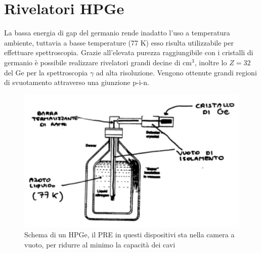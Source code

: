 \section{Rivelatori HPGe}
La bassa energia di gap del germanio rende inadatto l'uso a temperatura ambiente, tuttavia a basse temperature (77 K) esso risulta utilizzabile
per effettuare spettroscopia.
Grazie all'elevata purezza raggiungibile con i cristalli di germanio \`e possibile realizzare rivelatori grandi decine di cm$^3$, inoltre
lo $Z=32$ del Ge per la spettroscopia $\gamma$ ad alta risoluzione.
Vengono ottenute grandi regioni di svuotamento attraverso una giunzione p-i-n.
\begin{figure}[htbp]
\begin{center}
\includegraphics[scale=1]{./Immagini/SchemaHPGe.png}
\caption{Schema di un HPGe, il PRE in questi dispositivi sta nella camera a vuoto, per ridurre al minimo la capacit\`a dei cavi}
\label{fig:schemaHPGe}
\end{center}
\end{figure}